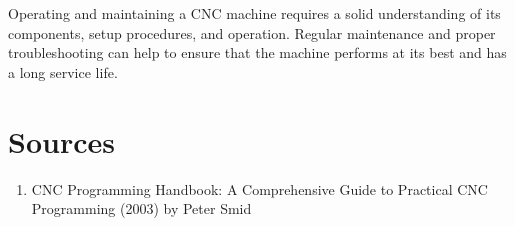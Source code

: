 \documentclass{article}
\begin{document}
Operating and maintaining a CNC machine requires a solid understanding of its components, setup procedures, and operation. Regular maintenance and proper troubleshooting can help to ensure that the machine performs at its best and has a long service life.

\section*{Sources}
\begin{enumerate}
    \item CNC Programming Handbook: A Comprehensive Guide to Practical CNC Programming (2003) by Peter Smid
\end{enumerate}
\end{document}
